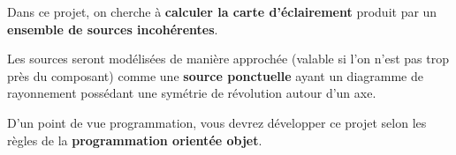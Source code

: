 Dans ce projet, on cherche à \textbf{calculer la carte d'éclairement} produit par un \textbf{ensemble de sources incohérentes}.

Les sources seront modélisées de manière approchée (valable si l'on n'est pas trop près du composant) comme une \textbf{source ponctuelle} ayant un diagramme de rayonnement possédant une symétrie de révolution autour d'un axe.



\medskip

D'un point de vue programmation, vous devrez développer ce projet selon les règles de la \textbf{programmation orientée objet}.